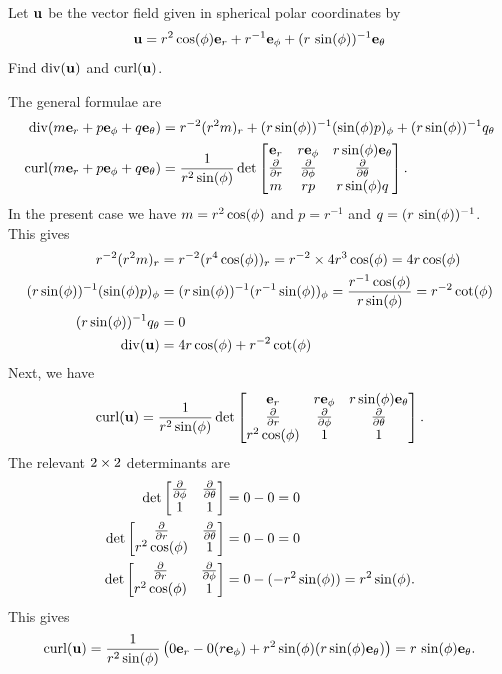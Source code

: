 \documentclass[a4paper]{amsart}
\renewenvironment{solution}{\SolutionInline}{\endSolutionInline}
\begin{document}
\begin{exercise}
 Let $\mathbf{u}$ be the vector field given in spherical polar coordinates by
 \[ \mathbf{u} = r^2\cos(\phi) \mathbf{e}_r + r^{-1}\mathbf{e}_{\phi} +
            (r\,\sin(\phi))^{-1}\mathbf{e}_{\theta}
 \]
 Find $\operatorname{div}(\mathbf{u})$ and $\operatorname{curl}(\mathbf{u})$.
\end{exercise}
\begin{solution}
 The general formulae are 
 \begin{align*}
  \operatorname{div}(m\mathbf{e}_r+p\mathbf{e}_\phi+q\mathbf{e}_\theta)
     &= r^{-2}(r^2m)_r + (r\sin(\phi))^{-1}(\sin(\phi)p)_\phi + 
         (r\sin(\phi))^{-1}q_\theta \\
  \operatorname{curl}(m\mathbf{e}_r+p\mathbf{e}_\phi+q\mathbf{e}_\theta)
     &= \frac{1}{r^2\sin(\phi)} \det\left[\begin{matrix}
          \mathbf{e}_r & r\mathbf{e}_\phi & r\sin(\phi)\mathbf{e}_\theta \\
          \frac{\partial}{\partial r}  & \frac{\partial}{\partial\phi}      & \frac{\partial}{\partial\theta}  \\
          m     & rp        & r\sin(\phi)q \end{matrix}\right].
 \end{align*}
 In the present case we have $m=r^2\cos(\phi)$ and $p=r^{-1}$ and
 $q=(r\,\sin(\phi))^{-1}$.  This gives
 \begin{align*}
  r^{-2}(r^2m)_r
   &= r^{-2}(r^4\cos(\phi))_r
    = r^{-2}\times 4r^3\cos(\phi)
    = 4r\cos(\phi) \\
  (r\sin(\phi))^{-1}(\sin(\phi)p)_\phi
   &= (r\sin(\phi))^{-1}(r^{-1}\sin(\phi))_\phi
    = \frac{r^{-1}\cos(\phi)}{r\sin(\phi)}
    = r^{-2}\cot(\phi) \\
  (r\sin(\phi))^{-1}q_\theta 
   &= 0 \\
  \operatorname{div}(\mathbf{u}) &= 4r\cos(\phi) + r^{-2}\cot(\phi)
 \end{align*}
 Next, we have
 \[ \operatorname{curl}(\mathbf{u}) = 
      \frac{1}{r^2\sin(\phi)} \det\left[\begin{matrix}
          \mathbf{e}_r & r\mathbf{e}_\phi & r\sin(\phi)\mathbf{e}_\theta \\
          \frac{\partial}{\partial r}  & \frac{\partial}{\partial\phi}      & \frac{\partial}{\partial\theta}  \\
          r^2\cos(\phi) & 1 & 1 \end{matrix}\right].
 \]
 The relevant $2\times 2$ determinants are 
 \begin{align*}
  \det\left[\begin{matrix} \frac{\partial}{\partial\phi} & \frac{\partial}{\partial\theta} \\ 1 & 1 \end{matrix}\right] 
   &= 0 - 0 = 0 \\
  \det\left[\begin{matrix} \frac{\partial}{\partial r} & \frac{\partial}{\partial\theta} \\ r^2\cos(\phi) & 1 \end{matrix}\right] 
   &= 0 - 0 = 0 \\
  \det\left[\begin{matrix} \frac{\partial}{\partial r} & \frac{\partial}{\partial\phi} \\ r^2\cos(\phi) & 1 \end{matrix}\right] 
   &= 0 - (-r^2\sin(\phi)) = r^2\sin(\phi).
 \end{align*}
 This gives
 \[ \operatorname{curl}(\mathbf{u}) =
     \frac{1}{r^2\sin(\phi)}\left(
      0 \mathbf{e}_r - 0 (r\mathbf{e}_\phi) + r^2\sin(\phi)(r\sin(\phi)\mathbf{e}_\theta)
     \right) = r\,\sin(\phi)\mathbf{e}_\theta.
 \]
\end{solution}
\end{document}
